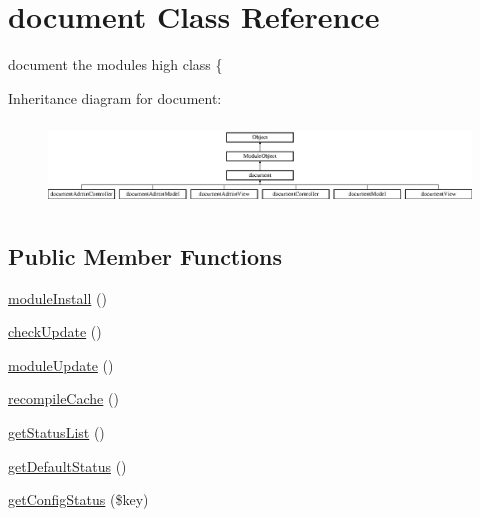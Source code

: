 \hypertarget{classdocument}{}\section{document Class Reference}
\label{classdocument}


document the module\textquotesingle{}s high class \{  


Inheritance diagram for document\+:\begin{figure}[H]
\begin{center}
\leavevmode
\includegraphics[height=2.262626cm]{classdocument}
\end{center}
\end{figure}
\subsection*{Public Member Functions}
\begin{DoxyCompactItemize}
\item 
\hyperlink{classdocument_a712db6c7542d0ec2cfdde35583a3b7ba}{module\+Install} ()
\item 
\hyperlink{classdocument_a71d01592758989490b56cbd6a2a92e37}{check\+Update} ()
\item 
\hyperlink{classdocument_ad0568fe26b80e3bc328a3fae4997354c}{module\+Update} ()
\item 
\hyperlink{classdocument_ae08854265fa7f6cb8b792d5c1ab93dc2}{recompile\+Cache} ()
\item 
\hyperlink{classdocument_ae90cc64e28afdfa204844ed6d03b40e7}{get\+Status\+List} ()
\item 
\hyperlink{classdocument_aacc6b168cae9bf79d7a13d6f5bb4fdfb}{get\+Default\+Status} ()
\item 
\hyperlink{classdocument_a319eeb35de3ffef5cb32374283b7bf14}{get\+Config\+Status} (\$key)
\end{DoxyCompactItemize}
